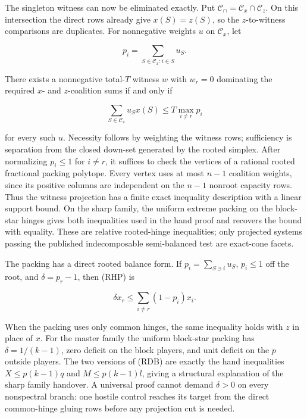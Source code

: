 \documentclass[11pt]{article}
\begin{document}
The singleton witness can now be eliminated exactly.  Put
$\mathcal C_\cap=\mathcal C_x\cap\mathcal C_z$.  On this intersection the
direct rows already give $x(S)=z(S)$, so the $z$-to-witness comparisons are
duplicates.  For nonnegative weights $u$ on $\mathcal C_x$, let

\[
 p_i=\sum_{S\in\mathcal C_x:i\in S}u_S.
\]

There exists a nonnegative total-$T$ witness $w$ with $w_r=0$ dominating the
required $x$- and $z$-coalition sums if and only if

\[
 \sum_{S\in\mathcal C_x}u_Sx(S)
 \le T\max_{i\ne r}p_i                                      \tag{RHP}
\]

for every such $u$.  Necessity follows by weighting the witness rows;
sufficiency is separation from the closed down-set generated by the rooted
simplex.  After normalizing $p_i\le1$ for $i\ne r$, it suffices to check the
vertices of a rational rooted fractional packing polytope.  Every vertex
uses at most $n-1$ coalition weights, since its positive columns are
independent on the $n-1$ nonroot capacity rows.  Thus the witness projection
has a finite exact inequality description with a linear support bound.  On
the sharp family, the uniform extreme packing on the block-star hinges gives
both inequalities used in the hand proof and recovers the bound with
equality.  These are relative rooted-hinge inequalities; only projected
systems passing the published indecomposable semi-balanced test are
exact-cone facets.

The packing has a direct rooted balance form.  If
$p_i=\sum_{S\ni i}u_S$, $p_i\le1$ off the root, and
$\delta=p_r-1$, then (RHP) is

\[
 \delta x_r\le\sum_{i\ne r}(1-p_i)x_i.                 \tag{RDB}
\]

When the packing uses only common hinges, the same inequality holds with
$z$ in place of $x$.  For the master family the uniform block-star packing
has $\delta=1/(k-1)$, zero deficit on the block players, and unit deficit on
the $p$ outside players.  The two versions of (RDB) are exactly the hand
inequalities $X\le p(k-1)q$ and $M\le p(k-1)l$, giving a structural
explanation of the sharp family handover.  A universal proof cannot demand
$\delta>0$ on every nonspectral branch: one hostile control reaches its
target from the direct common-hinge gluing rows before any projection cut is
needed.
\end{document}
